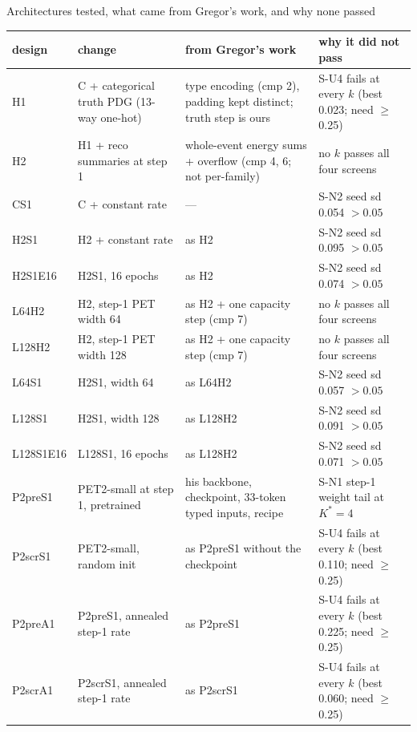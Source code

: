 \documentclass[aspectratio=169,10pt]{beamer}
\def\evidencetext{}
\begin{document}
\gdef\evidencetext{\texttt{dev/SCREENS-20260927-3d.json}; \texttt{results/final/coverage\_dev/decision\_final.json}; \texttt{DEVELOPMENT-20260926.md}; \texttt{nd-unfolding/pet/configuration\_comparison/CONFIGURATION\_COMPARISON-20260918.md (Gregor's minerva-ml pinned at fc9a099; sections cited as cmp)}}
\begin{frame}{Architectures tested, what came from Gregor's work, and why none passed}
{\tiny
\begin{tabular}{llll}
\toprule
design & change & from Gregor's work & why it did not pass \\
\midrule
H1 & C + categorical truth PDG (13-way one-hot) & type encoding (cmp 2), padding kept distinct; truth step is ours & S-U4 fails at every $k$ (best 0.023; need $\ge$ 0.25) \\
H2 & H1 + reco summaries at step 1 & whole-event energy sums + overflow (cmp 4, 6; not per-family) & no $k$ passes all four screens \\
CS1 & C + constant rate & --- & S-N2 seed sd 0.054 $> 0.05$ \\
H2S1 & H2 + constant rate & as H2 & S-N2 seed sd 0.095 $> 0.05$ \\
H2S1E16 & H2S1, 16 epochs & as H2 & S-N2 seed sd 0.074 $> 0.05$ \\
L64H2 & H2, step-1 PET width 64 & as H2 + one capacity step (cmp 7) & no $k$ passes all four screens \\
L128H2 & H2, step-1 PET width 128 & as H2 + one capacity step (cmp 7) & no $k$ passes all four screens \\
L64S1 & H2S1, width 64 & as L64H2 & S-N2 seed sd 0.057 $> 0.05$ \\
L128S1 & H2S1, width 128 & as L128H2 & S-N2 seed sd 0.091 $> 0.05$ \\
L128S1E16 & L128S1, 16 epochs & as L128H2 & S-N2 seed sd 0.071 $> 0.05$ \\
P2preS1 & PET2-small at step 1, pretrained & his backbone, checkpoint, 33-token typed inputs, recipe & S-N1 step-1 weight tail at $K^*=4$ \\
P2scrS1 & PET2-small, random init & as P2preS1 without the checkpoint & S-U4 fails at every $k$ (best 0.110; need $\ge$ 0.25) \\
P2preA1 & P2preS1, annealed step-1 rate & as P2preS1 & S-U4 fails at every $k$ (best 0.225; need $\ge$ 0.25) \\
P2scrA1 & P2scrS1, annealed step-1 rate & as P2scrS1 & S-U4 fails at every $k$ (best 0.060; need $\ge$ 0.25) \\

\end{tabular}}
\end{frame}
\end{document}
